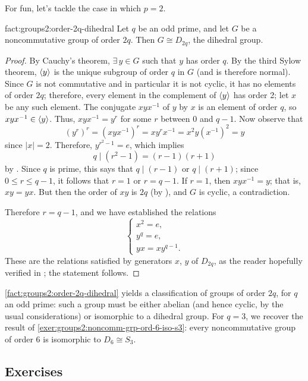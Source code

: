For fun, let's tackle the case in which $p = 2$.
\begin{fact}{}{fact:groups2:order-2q-dihedral}
  Let $q$ be an odd prime, and let $G$ be a noncommutative group of
  order $2q$.  Then $G \cong D_{2q}$, the dihedral group.
\end{fact}
\begin{proof}
  By Cauchy's theorem, $\exists\, y \in G$ such that $y$ has order
  $q$. By the third Sylow theorem, $\langle y\rangle$ is the unique subgroup
  of order $q$ in $G$ (and is therefore normal). Since $G$ is not
  commutative and in particular it is not cyclic, it has no elements
  of order $2q$; therefore, every element in the complement of
  $\langle y\rangle$ has order 2; let $x$ be any such element.  The
  conjugate $xyx^{-1}$ of $y$ by $x$ is an element of order $q$, so
  $xyx^{-1} \in \langle y\rangle$. Thus, $xyx^{-1} = y^r$ for some $r$
  between 0 and $q - 1$.  Now observe that
  \[
    (y^r)^r = (xyx^{-1})^r = xy^r x^{-1} = x^2 y(x^{-1})^2 = y
  \]
  since $|x| = 2$. Therefore, $y^{r^2 - 1} = e$, which implies
  \[
    q \mid (r^2 - 1) = (r-1)(r+1)
  \]
  by . Since $q$ is prime, this says
  that $q \mid (r-1)$ or $q \mid (r+1)$; since $0 \leq r \leq q-1$, it
  follows that $r = 1$ or $r = q - 1$.  If $r = 1$, then
  $xyx^{-1} = y$; that is, $xy = yx$. But then the order of $xy$ is
  $2q$ (by ), and $G$ is
  cyclic, a contradiction.

  Therefore $r = q - 1$, and we have established the relations
  \[
    \begin{cases}
      x^2 = e, \\
      y^q = e, \\
      yx = xy^{q-1}.
    \end{cases}
  \]
  These are the relations satisfied by generators $x$, $y$ of
  $D_{2q}$, as the reader hopefully verified in
  ; the statement follows.
\end{proof}
\cref{fact:groups2:order-2q-dihedral} yields a classification of
groups of order $2q$, for $q$ an odd prime: such a group must be
either abelian (and hence cyclic, by the usual considerations) or
isomorphic to a dihedral group.  For $q = 3$, we recover the result of
\cref{exer:groups2:noncomm-grp-ord-6-iso-s3}: every noncommutative
group of order 6 is isomorphic to $D_6 \cong S_3$.

\subsection*{Exercises}

